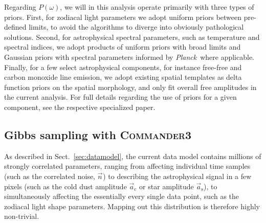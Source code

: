 \documentclass{aa}
\def\commanderthree{\textsc{Commander3}}
\def\Planck{\textit{Planck}}
\newcommand{\n}[0]{\vec{n}}
\renewcommand{\a}[0]{\vec{a}}
\begin{document}
Regarding $P(\omega)$, we will in this analysis operate primarily with
three types of priors. First, for zodiacal light parameters we adopt
uniform priors between pre-defined limits, to avoid the algorithms to
diverge into obviously pathological solutions. Second, for
astrophysical spectral parameters, such as temperature and spectral
indices, we adopt products of uniform priors with broad limits and
Gaussian priors with spectral parameters informed by \Planck\ where
applicable. Finally, for a few select astrophysical components, for
instance free-free and carbon monoxide line emission, we adopt
existing spatial templates as delta function priors on the spatial
morphology, and only fit overall free amplitudes in the current
analysis. For full details regarding the use of priors for a given
component, see the respective specialized paper.

\subsection{Gibbs sampling with \commanderthree}

As described in Sect.~\ref{sec:datamodel}, the current data model
contains millions of strongly correlated parameters, ranging from
affecting individual time samples (such as the correlated noise,
$\n_{\mathrm{}}$) to describing the astrophysical signal in a few
pixels (such as the cold dust amplitude $\a_{\mathrm{c}}$ or star
amplitude $\a_{\mathrm{s}}$), to simultaneously affecting the
essentially every single data point, such as the zodiacal light shape
parameters. Mapping out this distribution is therefore highly
non-trivial.
\end{document}
